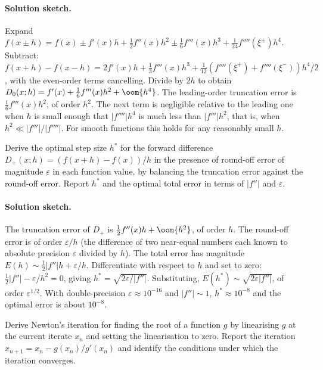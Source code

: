 \paragraph{Solution sketch.}
Expand $f(x \pm h) = f(x) \pm f'(x) h + \tfrac{1}{2} f''(x) h^{2}
\pm \tfrac{1}{6} f'''(x) h^{3} + \tfrac{1}{24} f''''(\xi^{\pm})
h^{4}$. Subtract: $f(x + h) - f(x - h) = 2 f'(x) h +
\tfrac{1}{3} f'''(x) h^{3} + \tfrac{1}{12} (f''''(\xi^{+}) +
f''''(\xi^{-})) h^{4}/2$, with the even-order terms cancelling.
Divide by $2 h$ to obtain $D_{0}(x; h) = f'(x) + \tfrac{1}{6}
f'''(x) h^{2} + \oom{h^{4}}$. The leading-order truncation error
is $\tfrac{1}{6} f'''(x) h^{2}$, of order $h^{2}$. The next term
is negligible relative to the leading one when $h$ is small
enough that $|f''''| h^{4}$ is much less than $|f'''| h^{2}$,
that is, when $h^{2} \ll |f'''| / |f''''|$. For smooth functions
this holds for any reasonably small $h$.

\begin{exercise}
Derive the optimal step size $h^{*}$ for the forward difference
$D_{+}(x; h) = (f(x + h) - f(x))/h$ in the presence of round-off
error of magnitude $\varepsilon$ in each function value, by
balancing the truncation error against the round-off error.
Report $h^{*}$ and the optimal total error in terms of $|f''|$
and $\varepsilon$.
\end{exercise}

\paragraph{Solution sketch.}
The truncation error of $D_{+}$ is $\tfrac{1}{2} f''(x) h +
\oom{h^{2}}$, of order $h$. The round-off error is of order
$\varepsilon / h$ (the difference of two near-equal numbers each
known to absolute precision $\varepsilon$ divided by $h$). The
total error has magnitude $E(h) \sim \tfrac{1}{2} |f''| h +
\varepsilon / h$. Differentiate with respect to $h$ and set to
zero: $\tfrac{1}{2} |f''| - \varepsilon / h^{2} = 0$, giving
$h^{*} = \sqrt{2 \varepsilon / |f''|}$. Substituting,
$E(h^{*}) \sim \sqrt{2 \varepsilon |f''|}$, of order
$\varepsilon^{1/2}$. With double-precision $\varepsilon \approx
10^{-16}$ and $|f''| \sim 1$, $h^{*} \approx 10^{-8}$ and the
optimal error is about $10^{-8}$.

\begin{exercise}
Derive Newton's iteration for finding the root of a function $g$
by linearising $g$ at the current iterate $x_{n}$ and setting the
linearisation to zero. Report the iteration $x_{n + 1} = x_{n} -
g(x_{n})/g'(x_{n})$ and identify the conditions under which the
iteration converges.
\end{exercise}

